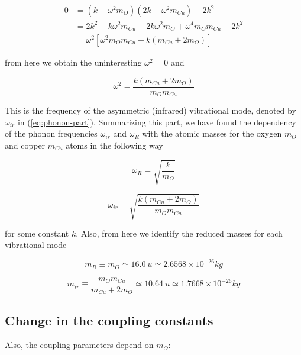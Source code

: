 \begin{equation}
  \begin{split}
    0 & = (k-\omega^2m_O)(2k-\omega^2m_{Cu})-2k^2 \\
      & = 2k^2-k\omega^2m_{Cu}-2k\omega^2m_O+\omega^4m_Om_{Cu}-2k^2 \\
      & = \omega^2[\omega^2m_Om_{Cu}-k(m_{Cu}+2m_O)]
  \end{split}
\end{equation}

\noindent from here we obtain the uninteresting $\omega^2=0$ and

\begin{equation}
  \omega^2 = \frac{k(m_{Cu}+2m_O)}{m_Om_{Cu}}
\end{equation}

This is the frequency of the asymmetric (infrared) vibrational mode, denoted by $\omega_{ir}$ in (\ref{eq:phonon-part}).
Summarizing this part, we have found the dependency of the phonon frequencies $\omega_{ir}$ and $\omega_R$ with the atomic masses for the oxygen $m_O$ and copper $m_{Cu}$ atoms in the following way

\begin{equation}
  \label{eq:omegaR}
  \omega_{R}= \sqrt{\frac{k}{m_O}}
\end{equation}

\begin{equation}
  \label{eq:omegair}
  \omega_{ir} = \sqrt{\frac{k(m_{Cu}+2m_O)}{m_Om_{Cu}}}
\end{equation}

\noindent for some constant $k$.
Also, from here we identify the reduced masses for each vibrational mode

\begin{equation}
  \label{eq:redMassR}
  m_R \equiv m_O \simeq 16.0\ u \simeq 2.6568 \times 10^{-26} kg
\end{equation}

\begin{equation}
  \label{eq:redMassIr}
  m_{ir} \equiv \frac{m_Om_{Cu}}{m_{Cu}+2m_O} \simeq 10.64\ u \simeq 1.7668 \times 10^{-26}kg
\end{equation}

\subsection{Change in the coupling constants}

Also, the coupling parameters depend on $m_O$\cite{?}:

